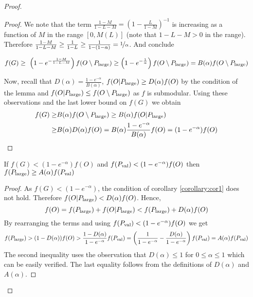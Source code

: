 \documentclass[a4paper,UKenglish,cleveref, autoref]{lipics-v2019}
\begin{document}
\begin{proof}
\begin{proof}
  	We note that the term $\frac{1-M}{1-L-M} = \left(  1- \frac{L}{1-M} \right)^{-1}$ is increasing as a function
  	of $M$  in the range $[0, M(L)]$ (note that $1-L-M >0$ in the range).
  	Therefore $\frac{1-M}{1-L-M} \geq  \frac{1 }{1-L}  \geq \frac{1}{1-(1-\alpha)} = \nicefrac[]{1}{\alpha}$. And conclude
  		
  	  $$f(G)
  	\geq \ \left(1-e^{- \frac{1-M }{1-L-M}}\right) f(O\setminus P_{\text{large}}) \geq \left( 1- e ^ {- \frac{1}{ \alpha}} \right)f(O\setminus P_{\text{large}})
  	= B(\alpha)f(O\setminus P_{\text{large}}) $$
  	
  	Now, recall that $D(\alpha)= \frac{1-e^{-\alpha}}{B(\alpha)}$,
	$f(O|P_{\text{large}}) \geq D(\alpha) f(O)$ by the condition of the
	lemma and $f(O|P_{\text{large}}) \leq f(O\setminus P_{\text{large}})$ as
	$f$ is submodular. Using these observations and the last lower
	bound on $f(G)$ we obtain
\begin{align*}
f(G) \geq& B(\alpha)f(O\setminus P_{\text{large}})  \geq
B(\alpha) f(O|P_{\text{large}})\\  \geq&
B(\alpha ) D(\alpha ) f(O)
= B(\alpha)\frac{1-e^{-\alpha}}{B(\alpha) }f(O)= (1-e^{-\alpha})f(O)
\end{align*}

	\end{proof}

	\begin{corollary}
		\label{corollary:cor2}
		If $f(G)< (1-e^{-\alpha})f(O)$ and $f(P_{\text{val}}) < (1-e^{-\alpha})f(O)$ then
		$f(P_{\text{large}}) \geq A(\alpha) f(P_{\text{val}})$
		\end{corollary}
	\begin{proof}
		As $f(G)< (1-e^{-\alpha})$, the condition of corollary \ref{corollary:cor1} does not hold. Therefore
		$f(O|P_{\text{large}})< D(\alpha) f(O)$. Hence,
		$$f(O)= f(P_{\text{large}}) + f(O|P_{\text{large}}) < f(P_{\text{large}}) + D(\alpha) f(O)$$
		By rearranging the terms and using $f(P_{\text{val}}) < (1-e^{-\alpha})f(O)$
		we get
		$$f(P_{\text{large}}) > (1-D(\alpha)) f(O) > \frac{1-D(\alpha)}{1-e^{-\alpha}} f(P_{\text{val}})
		= \left(\frac{1}{1-e^{-\alpha}} - \frac{D(\alpha)}{1-e^{-\alpha}}\right) f(P_{\text{val}}) = A(\alpha) f(P_{\text{val}})$$
		The second inequality uses the observation that $D(\alpha) \leq 1$ for $0\leq \alpha \leq 1$ which can be easily verified. The last equality follows from the definitions
		of $D(\alpha)$ and $A(\alpha)$.
		

\end{proof}
\end{proof}
\end{document}
